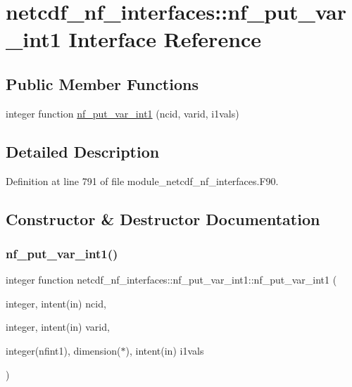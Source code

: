 \hypertarget{interfacenetcdf__nf__interfaces_1_1nf__put__var__int1}{}\section{netcdf\+\_\+nf\+\_\+interfaces\+:\+:nf\+\_\+put\+\_\+var\+\_\+int1 Interface Reference}
\label{interfacenetcdf__nf__interfaces_1_1nf__put__var__int1}
\subsection*{Public Member Functions}
\begin{DoxyCompactItemize}
\item 
integer function \hyperlink{interfacenetcdf__nf__interfaces_1_1nf__put__var__int1_a9d17fc68c0c5a2b511df2e0bb41fa9a8}{nf\+\_\+put\+\_\+var\+\_\+int1} (ncid, varid, i1vals)
\end{DoxyCompactItemize}


\subsection{Detailed Description}


Definition at line 791 of file module\+\_\+netcdf\+\_\+nf\+\_\+interfaces.\+F90.



\subsection{Constructor \& Destructor Documentation}
\mbox{\label{interfacenetcdf__nf__interfaces_1_1nf__put__var__int1_a9d17fc68c0c5a2b511df2e0bb41fa9a8}} 
\subsubsection{\texorpdfstring{nf\+\_\+put\+\_\+var\+\_\+int1()}{nf\_put\_var\_int1()}}
{\footnotesize\ttfamily integer function netcdf\+\_\+nf\+\_\+interfaces\+::nf\+\_\+put\+\_\+var\+\_\+int1\+::nf\+\_\+put\+\_\+var\+\_\+int1 (\begin{DoxyParamCaption}\item[{integer, intent(in)}]{ncid,  }\item[{integer, intent(in)}]{varid,  }\item[{integer(nfint1), dimension($\ast$), intent(in)}]{i1vals }\end{DoxyParamCaption})}



